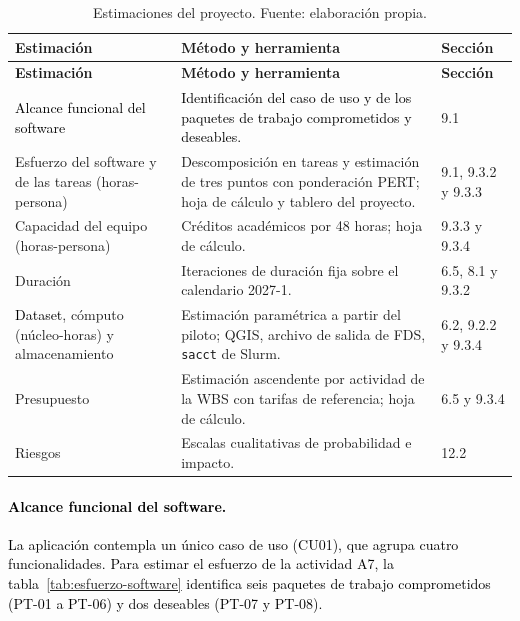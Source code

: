 \begin{longtable}{|p{}|p{}|p{}|}
\caption{Estimaciones del proyecto. Fuente: elaboración propia.}\label{tab:estimaciones}\\
\hline
\textbf{Estimación} & \textbf{Método y herramienta} & \textbf{Sección}\tabularnewline\hline
\endfirsthead
\hline
\textbf{Estimación} & \textbf{Método y herramienta} & \textbf{Sección}\tabularnewline\hline
\endhead
\raggedright \textcolor{black}{Alcance funcional del software} & \raggedright \textcolor{black}{Identificación del caso de uso y de los paquetes de trabajo comprometidos y deseables.} & \raggedright 9.1\tabularnewline\hline
\raggedright Esfuerzo del software y de las tareas (horas-persona) & \raggedright Descomposición en tareas y estimación de tres puntos con ponderación PERT; hoja de cálculo y tablero del proyecto. & \raggedright 9.1, 9.3.2 y 9.3.3\tabularnewline\hline
\raggedright Capacidad del equipo (horas-persona) & \raggedright Créditos académicos por 48 horas; hoja de cálculo. & \raggedright 9.3.3 y 9.3.4\tabularnewline\hline
\raggedright Duración & \raggedright Iteraciones de duración fija sobre el calendario 2027-1. & \raggedright 6.5, 8.1 y 9.3.2\tabularnewline\hline
\raggedright \textcolor{black}{Dataset}, cómputo (núcleo-horas) y almacenamiento & \raggedright Estimación paramétrica a partir del piloto; QGIS, archivo de salida de FDS, \texttt{sacct} de Slurm. & \raggedright 6.2, 9.2.2 y 9.3.4\tabularnewline\hline
\raggedright Presupuesto & \raggedright Estimación ascendente por actividad de la WBS con tarifas de referencia; hoja de cálculo. & \raggedright 6.5 y 9.3.4\tabularnewline\hline
\raggedright Riesgos & \raggedright Escalas cualitativas de probabilidad e impacto. & \raggedright 12.2\tabularnewline\hline
\end{longtable}

\paragraph{\textcolor{black}{Alcance funcional del software.}} \textcolor{black}{La aplicación contempla un único caso de uso (CU01), que agrupa cuatro funcionalidades. Para estimar el esfuerzo de la actividad A7, la tabla~\ref{tab:esfuerzo-software} identifica seis paquetes de trabajo comprometidos (PT-01 a PT-06) y dos deseables (PT-07 y PT-08).}

